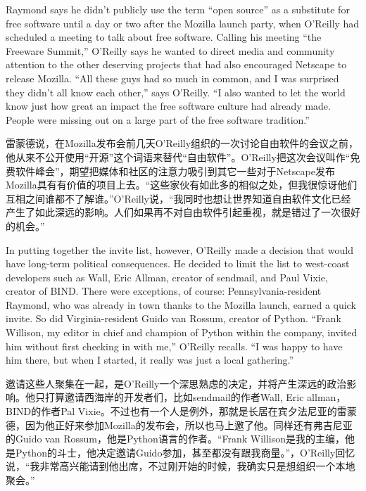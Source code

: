\ifdefined\eng
Raymond says he didn't publicly use the term ``open source'' as a substitute for free software until a day or two after the Mozilla launch party, when O'Reilly had scheduled a meeting to talk about free software. Calling his meeting ``the Freeware Summit,'' O'Reilly says he wanted to direct media and community attention to the other deserving projects that had also encouraged Netscape to release Mozilla. ``All these guys had so much in common, and I was surprised they didn't all know each other,'' says O'Reilly. ``I also wanted to let the world know just how great an impact the free software culture had already made. People were missing out on a large part of the free software tradition.''
\fi

\ifdefined\chs
雷蒙德说，在Mozilla发布会前几天O'Reilly组织的一次讨论自由软件的会议之前，他从来不公开使用``开源''这个词语来替代``自由软件''。O'Reilly把这次会议叫作``免费软件峰会''，期望把媒体和社区的注意力吸引到其它一些对于Netscape发布Mozilla具有有价值的项目上去。``这些家伙有如此多的相似之处，但我很惊讶他们互相之间谁都不了解谁。''O'Reilly说，``我同时也想让世界知道自由软件文化已经产生了如此深远的影响。人们如果再不对自由软件引起重视，就是错过了一次很好的机会。''
\fi

\ifdefined\eng
In putting together the invite list, however, O'Reilly made a decision that would have long-term political consequences. He decided to limit the list to west-coast developers such as Wall, Eric Allman, creator of sendmail, and Paul Vixie, creator of BIND. There were exceptions, of course: Pennsylvania-resident Raymond, who was already in town thanks to the Mozilla launch, earned a quick invite. So did Virginia-resident Guido van Rossum, creator of Python. ``Frank Willison, my editor in chief and champion of Python within the company, invited him without first checking in with me,'' O'Reilly recalls. ``I was happy to have him there, but when I started, it really was just a local gathering.''
\fi

\ifdefined\chs
邀请这些人聚集在一起，是O'Reilly一个深思熟虑的决定，并将产生深远的政治影响。他只打算邀请西海岸的开发者们，比如sendmail的作者Wall, Eric allman，BIND的作者Pal Vixie。不过也有一个人是例外，那就是长居在宾夕法尼亚的雷蒙德，因为他正好来参加Mozilla的发布会，所以也马上邀了他。同样还有弗吉尼亚的Guido van Rossum，他是Python语言的作者。``Frank Willison是我的主编，他是Python的斗士，他决定邀请Guido参加，甚至都没有跟我商量。''，O'Reilly回忆说，``我非常高兴能请到他出席，不过刚开始的时候，我确实只是想组织一个本地聚会。''
\fi

